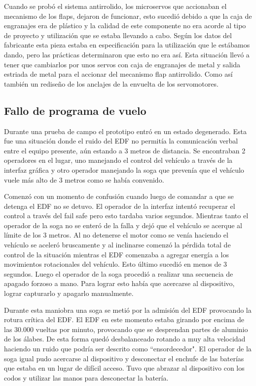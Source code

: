 \medskip

Cuando se probó el sistema antirrolido, los microservos que accionaban el mecanismo de los flaps, dejaron de funcionar, esto sucedió debido a que la caja de engranajes era de plástico y la calidad de este componente no era acorde al tipo de proyecto y utilización que se estaba llevando a cabo. Según los datos del fabricante esta pieza estaba en especificación para la utilización que le estábamos dando, pero las prácticas determinaron que esto no era así. Esta situación llevó a tener que cambiarlos por unos servos con caja de engranajes de metal y salida estriada de metal para el accionar del mecanismo flap antirrolido. Como así también un rediseño de los anclajes de la envuelta de los servomotores.

\subsection{Fallo de programa de vuelo}
Durante una prueba de campo el prototipo entró en un estado degenerado. Esta fue una situación donde el ruido del EDF no permitía la comunicación verbal entre el equipo presente, aún estando a 3 metros de distancia. Se encontraban 2 operadores en el lugar, uno manejando el control del vehículo a través de la interfaz gráfica y otro operador manejando la soga que prevenía que el vehículo vuele más alto de 3 metros como se había convenido.

Comenzó con un momento de confusión cuando luego de comandar a que se detenga el EDF no se detuvo. El operador de la interfaz intentó recuperar el control a través del fail safe pero esto tardaba varios segundos. Mientras tanto el operador de la soga no se enteró de la falla y dejó que el vehículo se acerque al límite de los 3 metros. Al no detenerse el motor como se venía haciendo el vehículo se aceleró bruscamente y al inclinarse comenzó la pérdida total de control de la situación mientras el EDF comenzaba a agregar energía a los movimientos rotacionales del vehículo. Esto último sucedió en menos de 3 segundos. Luego el operador de la soga procedió a realizar una secuencia de apagado forzoso a mano. Para lograr esto había que acercarse al dispositivo, lograr capturarlo y apagarlo manualmente.

Durante esta maniobra una soga se metió por la admisión del EDF provocando la rotura crítica del EDF. El EDF en este momento estaba girando por encima de las 30.000 vueltas por minuto, provocando que se desprendan partes de aluminio de los álabes. De esta forma quedó desbalanceado rotando a muy alta velocidad haciendo un ruido que podría ser descrito como ``ensordecedor". El operador de la soga igual pudo acercarse al dispositivo y desconectar el enchufe de las baterías que estaba en un lugar de difícil acceso. Tuvo que abrazar al dispositivo con los codos y utilizar las manos para desconectar la batería.

